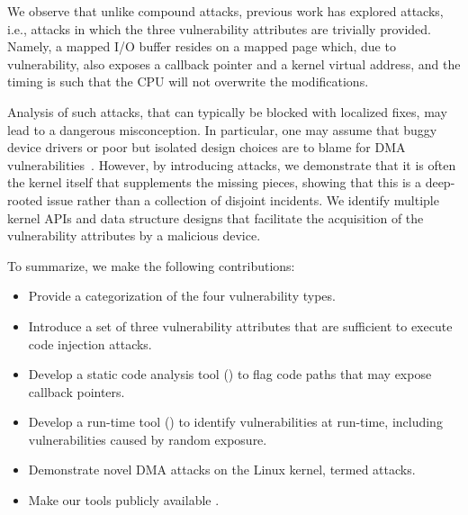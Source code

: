 We observe that unlike compound attacks, previous work has explored \simple{} attacks, i.e., attacks in which the three vulnerability attributes are trivially provided.
Namely, a mapped I/O buffer resides on a mapped page which, due to \subpage{} vulnerability, also exposes a callback pointer and a kernel virtual address, and the timing is such that the CPU will not overwrite the modifications.

Analysis of such \simple{} attacks, that can typically be blocked with localized fixes, may lead to a dangerous misconception. In particular, one may assume that buggy device drivers or poor but isolated design choices are to blame for DMA vulnerabilities~\cite{malka2015efficient,malka2015riommu}.
However, by introducing \compound attacks, we demonstrate that it is often the kernel itself that supplements the missing pieces, showing that this is a deep-rooted issue rather than a collection of disjoint incidents.
We identify multiple kernel APIs and data structure designs that facilitate the acquisition of the vulnerability attributes by a malicious device.


To summarize, we make the following contributions:
\begin{itemize}
    \item Provide a categorization of the four \subpage{} vulnerability types.
    \item Introduce a set of three vulnerability attributes that are sufficient to execute code injection attacks.
    \item Develop a static code analysis tool (\tool) to flag code paths that may expose callback pointers. 
    \item Develop a run-time tool (\dkasan) to identify \subpage{} vulnerabilities at run-time, including vulnerabilities caused by random exposure.
    \item Demonstrate novel DMA attacks on the Linux kernel, termed \compound{} attacks.
    \item Make our tools publicly available \cite{DKASAN,SPADE}.
\end{itemize}

